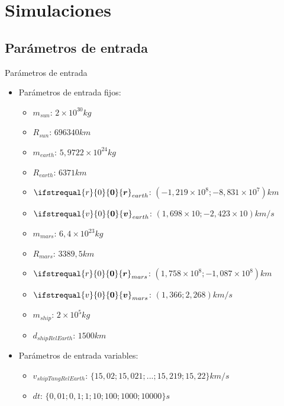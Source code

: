 \documentclass{beamer}
\renewcommand\vec[1]{\ifstrequal{#1}{0}{\ensuremath{\mathbf{0}}}{\ensuremath{\boldsymbol{#1}}}}
\begin{document}
    \section{Simulaciones}

        \subsection{Parámetros de entrada}

            \begin{frame}{Parámetros de entrada}
                \begin{itemize}
                    \item Parámetros de entrada fijos:
                    \begin{itemize}
                        \item $m_{sun}$: \alert{$2\times 10^{30}kg$}
                        \item $R_{sun}$: \alert{$696340km$}
                        \item $m_{earth}$: \alert{$5,9722\times 10^{24}kg$}
                        \item $R_{earth}$: \alert{$6371km$}
                        \item $\vec{r}_{earth}$: \alert{$(-1,219\times 10^{8}; -8,831\times 10^{7})km$}
                        \item $\vec{v}_{earth}$: \alert{$(1,698\times 10; -2,423\times 10)km/s$}
                        \item $m_{mars}$: \alert{$6,4\times 10^{23}kg$}
                        \item $R_{mars}$: \alert{$3389,5km$}
                        \item $\vec{r}_{mars}$: \alert{$(1,758\times 10^{8}; -1,087\times 10^{8})km$}
                        \item $\vec{v}_{mars}$: \alert{$(1,366; 2,268)km/s$}
                        \item $m_{ship}$: \alert{$2\times 10^{5} kg$}
                        \item $d_{shipRelEarth}$: \alert{$1500km$}
                    \end{itemize}
                    \item Parámetros de entrada variables:
                    \begin{itemize}
                        \item $v_{shipTangRelEarth}$: \alert{$\{15,02; 15,021; ...; 15,219; 15,22\}km/s$}
                        \item ${dt}$: \alert{$\{0,01;0,1;1;10;100;1000;10000\}s$}
                    \end{itemize}
                \end{itemize}
            \end{frame}
\end{document}
